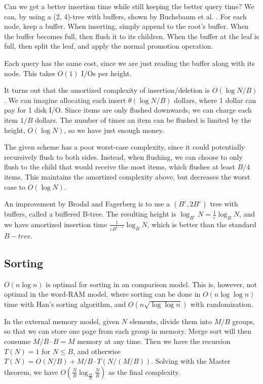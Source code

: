 \documentclass[11pt]{article}
\newcommand{\eps}{\varepsilon}
\begin{document}
Can we get a better insertion time while still keeping the better query time? We can, by using a (2, 4)-tree with buffers, shown by Buchsbaum et al. \cite{BGVW00}. For each node, keep a buffer. When inserting, simply append to the root's buffer. When the buffer becomes full, then flush it to its children. When the buffer at the leaf is full, then split the leaf, and apply the normal promotion operation.

Each query has the same cost, since we are just reading the buffer along with its node. This takes $O(1)$ I/Os per height.

It turns out that the amortized complexity of insertion/deletion is $O(\log N / B)$.
We can imagine allocating each insert $\theta(\log N / B)$ dollars, where 1 dollar can pay for 1 disk I/O. Since items are only flushed downwards, we can charge each item $1/B$ dollars. The number of times an item can be flushed is limited by the height, $O(\log N)$, so we have just enough money.

The given scheme has a poor worst-case complexity, since it could potentially recursively flush to both sides. Instead, when flushing, we can choose to only flush to the child that would receive the most items, which flushes at least $B/4$ items. This maintains the amortized complexity above, but decreases the worst case to $O(\log N)$.

An improvement by Brodal and Fagerberg \cite{BF03} is to use a $(B^\eps, 2B^\eps)$ tree with buffers, called a buffered B-tree. The resulting height is $\log_{B^\eps} N = \frac{1}{\eps} \log_B N$, and we have amortized insertion time $\frac{1}{\eps B^{1-\eps}} \log_B N$, which is better than the standard $B-tree$.

\subsection{Sorting}

$O(n \log n)$ is optimal for sorting in an comparison model. This is, however, not optimal in the word-RAM model, where sorting can be done in $O(n \log \log n)$ time with Han's sorting algorithm, and $O(n \sqrt{\log \log n})$ with randomization.

In the external memory model, given $N$ elements, divide them into $M / B$ groups, so that we can store one page from each group in memory. Merge sort will then consume $M / B \cdot B = M$ memory at any time. Then we have the recursion $T(N) = 1$ for $N \leq B$, and otherwise $T(N) = O(N/B) + M/B \cdot T(N / (M/B))$. Solving with the Master theorem, we have $O(\frac{N}{B} \log_{\frac{M}{B}} \frac{N}{B})$ as the final complexity.
\end{document}

